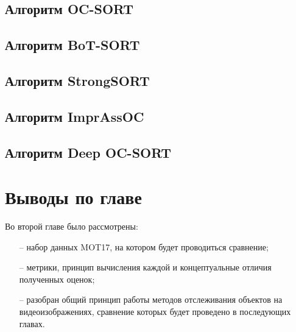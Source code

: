 \subsection{Алгоритм OC-SORT}


\subsection{Алгоритм BoT-SORT}


\subsection{Алгоритм StrongSORT}


\subsection{Алгоритм ImprAssOC}


\subsection{Алгоритм Deep OC-SORT}


\section{Выводы по главе}
Во второй главе было рассмотрены:
\begin{itemize}
  \item[--] набор данных MOT17, на котором будет проводиться сравнение;
  \item[--] метрики, принцип вычисления каждой и концептуальные отличия полученных оценок;
  \item[--] разобран общий принцип работы методов отслеживания объектов на видеоизображениях, сравнение которых будет проведено в последующих главах.  
\end{itemize}